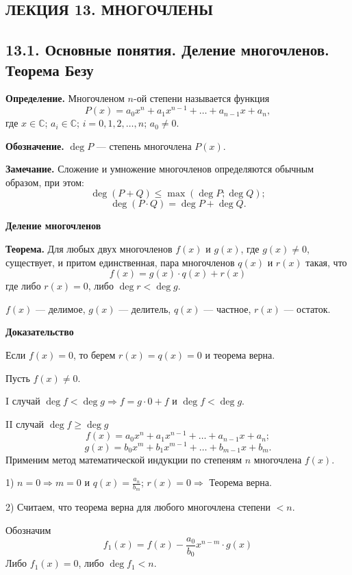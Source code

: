 \documentclass[12pt,a4paper]{article}
\begin{document}
\setcounter{page}{93}

\subsection*{\textbf{ЛЕКЦИЯ 13. МНОГОЧЛЕНЫ}}

\subsection*{\textbf{13.1. Основные понятия. Деление многочленов. Теорема Безу}}

\textbf{Определение.} Многочленом $n$-ой степени называется функция
$$
P(x)=a_0x^n+a_1x^{n-1}+\ldots+a_{n-1}x+a_n,
$$
где $x\in\mathbb C$; $a_i\in\mathbb C$; $i=0,1,2,\ldots,n$; $a_0\ne0$.

\textbf{Обозначение.} $\deg P$ --- степень многочлена $P(x)$.

\textbf{Замечание.} Сложение и умножение многочленов определяются
обычным образом, при этом:
$$
\deg(P+Q)\le \max(\deg P;\deg Q);
$$
$$
\deg(P\cdot Q)=\deg P+\deg Q.
$$

\textbf{Деление многочленов}

\textbf{Теорема.} Для любых двух многочленов $f(x)$ и $g(x)$, где
$g(x)\ne0$, существует, и притом единственная, пара многочленов
$q(x)$ и $r(x)$ такая, что
\begin{equation}
  f(x)=g(x)\cdot q(x)+r(x) \tag{13.1}
\end{equation}
где либо $r(x)=0$, либо $\deg r<\deg g$.

$f(x)$ --- делимое, $g(x)$ --- делитель, $q(x)$ --- частное, $r(x)$ --- остаток.

\textbf{Доказательство}

Если $f(x)=0$, то берем $r(x)=q(x)=0$ и теорема верна.

Пусть $f(x)\ne0$.

I случай $\deg f<\deg g\Rightarrow f=g\cdot0+f$ и $\deg f<\deg g$.

II случай $\deg f\ge\deg g$
$$
f(x)=a_0x^n+a_1x^{n-1}+\ldots+a_{n-1}x+a_n;
$$
$$
g(x)=b_0x^m+b_1x^{m-1}+\ldots+b_{m-1}x+b_m.
$$
Применим метод математической индукции по степеням $n$ многочлена $f(x)$.

1) $n=0\Rightarrow m=0$ и $q(x)=\frac{a_n}{b_m}$; $r(x)=0\Rightarrow$
Теорема верна.

2) Считаем, что теорема верна для любого многочлена степени $<n$.

Обозначим
\begin{equation}
f_1(x)=f(x)-\frac{a_0}{b_0}x^{n-m}\cdot g(x) \tag{13.2}
\end{equation}
Либо $f_1(x)=0$, либо $\deg f_1<n$.
\end{document}
